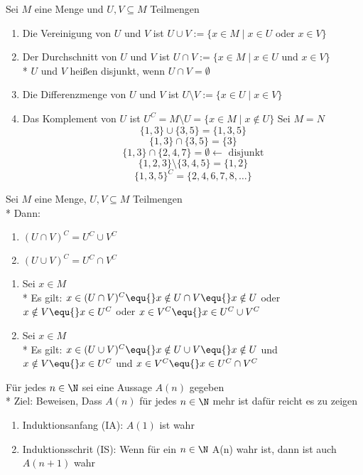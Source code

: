 Sei $M$ eine Menge und $U,V \subseteq M$ Teilmengen
\begin{enumerate}
\item Die Vereinigung von $U$ und $V$ ist $U \cup V := \{x \in M \mid x \in U$ oder $x \in V\}$
\item Der Durchschnitt von $U$ und $V$ ist $U \cap V := \{x \in M \mid x \in U$ und $x \in V\}$\\*
$U$ und $V$ heißen disjunkt, wenn $U \cap V = \emptyset$
\item Die Differenzmenge von $U$ und $V$ ist $U \setminus V := \{x \in U \mid x \in V\}$
\item Das Komplement von $U$ ist $U^C = M \setminus U = \{x \in M \mid x \notin U\}$
%
\bsp
Sei $M = N$
$$\{1,3\} \cup \{3,5\} = \{1,3,5\}$$
$$\{1,3\} \cap \{3,5\} = \{3\}$$
$$\{1,3\} \cap \{2,4,7\} = \emptyset \leftarrow\text{ disjunkt}$$
$$\{1,2,3\} \setminus \{3,4,5\} = \{1,2\}$$
$$\{1,3,5\}^C = \{2,4,6,7,8,…\}$$
\end{enumerate}

Sei $M$ eine Menge, $U,V \subseteq M$ Teilmengen\\*
Dann:
\begin{enumerate}
\item $(U \cap V)^C = U^C \cup V^C$
\item $(U \cup V)^C = U^C \cap V^C$
\end{enumerate}
%
\bew
\begin{enumerate}
\item{Sei $x \in M$\\*
Es gilt: $x \in (U \cap V)^C \equ{} x \notin U \cap V \equ{} x \notin U$ oder $x \notin V\equ{} x \in U^C$ oder $x \in V^C \equ{} x\in U^C \cup V^C$}
\item{ Sei $x \in M$\\* Es gilt: $x \in (U \cup V)^C \equ{} x \notin U \cup V \equ{} x \notin U$ und $x \notin V\equ{} x \in U^C$ und $x \in V^C \equ{} x\in U^C \cap V^C$}
\end{enumerate}

Für jedes $n \in \N$ sei eine Aussage $A(n)$ gegeben\\*
Ziel: Beweisen, Dass $A(n)$ für jedes $n \in \N$ mehr ist dafür reicht es zu zeigen
\begin{enumerate}
\item{Induktionsanfang (IA): $A(1)$ ist wahr}
\item{Induktionsschrit (IS): Wenn für ein $n \in \N$ A(n) wahr ist, dann ist auch $A(n+1)$ wahr}
\end{enumerate}

